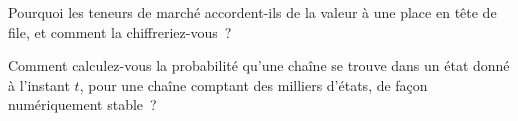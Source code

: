 \begin{interviewq}\label{iq:qm:markov-chains-and-queues:5}
Pourquoi les teneurs de marché accordent-ils de la valeur à une place en tête de file, et comment la chiffreriez-vous~?
\end{interviewq}

\begin{interviewq}\label{iq:qm:markov-chains-and-queues:6}
Comment calculez-vous la probabilité qu'une chaîne se trouve dans un état donné à l'instant $t$, pour une chaîne comptant des milliers
d'états, de façon numériquement stable~?
\end{interviewq}
